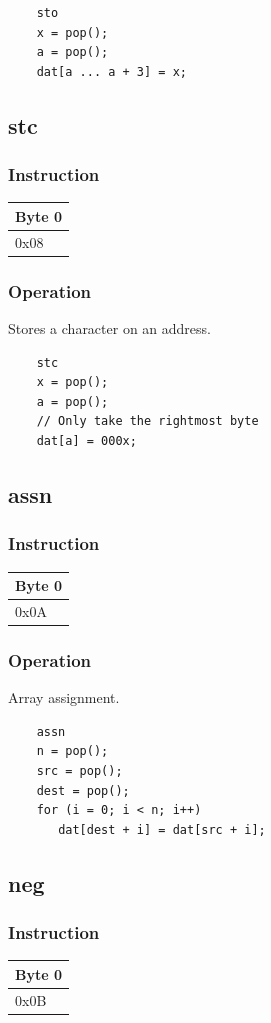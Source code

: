 \documentclass[11pt]{report}
\newcommand{\onebyteinstruction}[1]{
\begin{tabular}{|p{3.9em}|}
\hline
\tiny{Byte 0} \\ \hline
#1  \\ \hline
\end{tabular}
}
\begin{document}
	\begin{lstlisting}
	sto
	x = pop();
	a = pop();
	dat[a ... a + 3] = x;
	\end{lstlisting}

\subsection{stc}
\subsubsection{Instruction}
\onebyteinstruction{0x08}

\subsubsection{Operation}
Stores a character on an address.

	\begin{lstlisting}
	stc
	x = pop();
	a = pop();
	// Only take the rightmost byte
	dat[a] = 000x;
	\end{lstlisting}

\subsection{assn}
\subsubsection{Instruction}
\onebyteinstruction{0x0A}

\subsubsection{Operation}
Array assignment.

	\begin{lstlisting}
	assn
	n = pop();
	src = pop();
	dest = pop();
	for (i = 0; i < n; i++)
	   dat[dest + i] = dat[src + i];
	\end{lstlisting}

\subsection{neg}
\subsubsection{Instruction}
\onebyteinstruction{0x0B}
\end{document}
